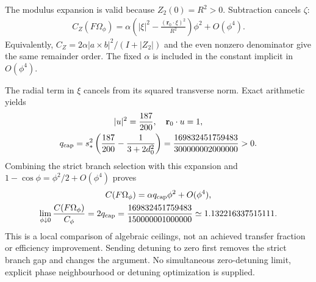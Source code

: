 The modulus expansion is valid because $Z_2(0)=R^2>0$. Subtraction cancels $\zeta$:
\begin{equation}\label{eq:a51}%
\begin{gathered}
C_Z(F\Omega_\phi)=\alpha\left(|\xi|^2-\frac{(\mathbf r_0\cdot \xi)^2}{R^2}\right)\phi^2
+O(\phi^4).
\end{gathered}
\end{equation}
Equivalently, $C_Z=2\alpha|a\times b|^2/(I+|Z_2|)$ and the even nonzero denominator give the same remainder order. The fixed $\alpha$ is included in the constant implicit in $O(\phi^4)$.

The radial term in $\xi$ cancels from its squared transverse norm. Exact arithmetic yields
\begin{equation}\label{eq:a52}%
\begin{gathered}
|u|^2=\frac{187}{200},\quad \mathbf r_0\cdot u=1,\\ q_{\rm cap}=s_*^2\left(\frac{187}{200}-\frac1{3+2d_0^2}\right)
=\frac{169832451759483}{300000002000000}>0.
\end{gathered}
\end{equation}
Combining the strict branch selection with this expansion and $1-\cos\phi=\phi^2/2+O(\phi^4)$ proves
\begin{equation}\label{eq:a53}%
\begin{gathered}
C(F\Omega_\phi)=\alpha q_{\rm cap}\phi^2+O(\phi^4),\\ \lim_{\phi\downarrow0}\frac{C(F\Omega_\phi)}{C_\phi}
=2q_{\rm cap}=\frac{169832451759483}{150000001000000}
\simeq1.132216337515111.
\end{gathered}
\end{equation}
This is a local comparison of algebraic ceilings, not an achieved transfer fraction or efficiency improvement. Sending detuning to zero first removes the strict branch gap and changes the argument. No simultaneous zero-detuning limit, explicit phase neighbourhood or detuning optimization is supplied.
